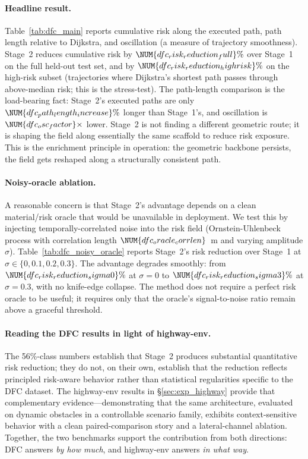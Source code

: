 \paragraph{Headline result.}
Table~\ref{tab:dfc_main} reports cumulative risk along the executed path, path length relative to Dijkstra, and oscillation (a measure of trajectory smoothness).
Stage~2 reduces cumulative risk by $\NUM{dfc_risk_reduction_full}\%$ over Stage~1 on the full held-out test set, and by $\NUM{dfc_risk_reduction_highrisk}\%$ on the high-risk subset (trajectories where Dijkstra's shortest path passes through above-median risk; this is the stress-test).
The path-length comparison is the load-bearing fact: Stage~2's executed paths are only $\NUM{dfc_path_length_increase}\%$ longer than Stage~1's, and oscillation is $\NUM{dfc_osc_factor}\times$ lower.
Stage~2 is not finding a different geometric route; it is shaping the field along essentially the same scaffold to reduce risk exposure.
This is the enrichment principle in operation: the geometric backbone persists, the field gets reshaped along a structurally consistent path.

\paragraph{Noisy-oracle ablation.}
A reasonable concern is that Stage~2's advantage depends on a clean material/risk oracle that would be unavailable in deployment.
We test this by injecting temporally-correlated noise into the risk field (Ornstein-Uhlenbeck process with correlation length $\NUM{dfc_oracle_corrlen}$~m and varying amplitude $\sigma$).
Table~\ref{tab:dfc_noisy_oracle} reports Stage~2's risk reduction over Stage~1 at $\sigma \in \{0, 0.1, 0.2, 0.3\}$.
The advantage degrades smoothly: from $\NUM{dfc_risk_reduction_sigma0}\%$ at $\sigma = 0$ to $\NUM{dfc_risk_reduction_sigma3}\%$ at $\sigma = 0.3$, with no knife-edge collapse.
The method does not require a perfect risk oracle to be useful; it requires only that the oracle's signal-to-noise ratio remain above a graceful threshold.

\paragraph{Reading the DFC results in light of highway-env.}
The 56\%-class numbers establish that Stage~2 produces substantial quantitative risk reduction; they do not, on their own, establish that the reduction reflects principled risk-aware behavior rather than statistical regularities specific to the DFC dataset.
The highway-env results in \S\ref{sec:exp_highway} provide that complementary evidence---demonstrating that the same architecture, evaluated on dynamic obstacles in a controllable scenario family, exhibits context-sensitive behavior with a clean paired-comparison story and a lateral-channel ablation.
Together, the two benchmarks support the contribution from both directions: DFC answers \emph{by how much}, and highway-env answers \emph{in what way}.

